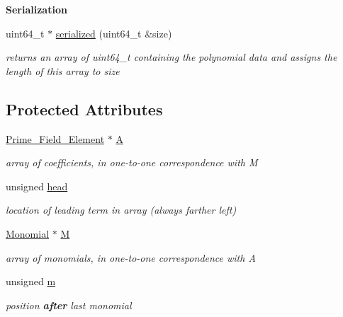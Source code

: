 \begin{Indent}\textbf{ Serialization}\par
\begin{DoxyCompactItemize}
\item 
uint64\+\_\+t $\ast$ \hyperlink{class_constant___polynomial_aafc581313f33e812add8db45cfaa1492}{serialized} (uint64\+\_\+t \&size)
\begin{DoxyCompactList}\small\item\em returns an array of {\ttfamily uint64\+\_\+t} containing the polynomial data and assigns the length of this array to {\ttfamily size} \end{DoxyCompactList}\end{DoxyCompactItemize}
\end{Indent}
\subsection*{Protected Attributes}
\begin{DoxyCompactItemize}
\item 
\mbox{\label{class_constant___polynomial_a0b78eef8746e334e8db176d479e734b9}} 
\hyperlink{class_prime___field___element}{Prime\+\_\+\+Field\+\_\+\+Element} $\ast$ \hyperlink{class_constant___polynomial_a0b78eef8746e334e8db176d479e734b9}{A}
\begin{DoxyCompactList}\small\item\em array of coefficients, in one-\/to-\/one correspondence with {\ttfamily M} \end{DoxyCompactList}\item 
\mbox{\label{class_constant___polynomial_ab82cd79a8965d04717a0c82ae79ff4b4}} 
unsigned \hyperlink{class_constant___polynomial_ab82cd79a8965d04717a0c82ae79ff4b4}{head}
\begin{DoxyCompactList}\small\item\em location of leading term in array (always farther left) \end{DoxyCompactList}\item 
\mbox{\label{class_constant___polynomial_aec23722090ac440cee1be3cb54ed5d16}} 
\hyperlink{class_monomial}{Monomial} $\ast$ \hyperlink{class_constant___polynomial_aec23722090ac440cee1be3cb54ed5d16}{M}
\begin{DoxyCompactList}\small\item\em array of monomials, in one-\/to-\/one correspondence with {\ttfamily A} \end{DoxyCompactList}\item 
\mbox{\label{class_constant___polynomial_acbd3e3d53eefdfae5b59431d40ccd11b}} 
unsigned \hyperlink{class_constant___polynomial_acbd3e3d53eefdfae5b59431d40ccd11b}{m}
\begin{DoxyCompactList}\small\item\em position {\bfseries after} last monomial \end{DoxyCompactList}\end{DoxyCompactItemize}
